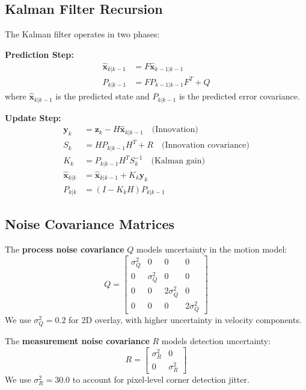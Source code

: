 \documentclass[9pt,a4paper,twocolumn,twoside]{tau-class/tau}
\begin{document}
    \subsection{Kalman Filter Recursion}

    The Kalman filter operates in two phases:

    \textbf{Prediction Step:}
    \begin{align}
        \hat{\mathbf{x}}_{k|k-1} &= F \hat{\mathbf{x}}_{k-1|k-1} \\
        P_{k|k-1} &= F P_{k-1|k-1} F^T + Q
    \end{align}
    where $\hat{\mathbf{x}}_{k|k-1}$ is the predicted state and $P_{k|k-1}$ is the predicted error covariance.

    \textbf{Update Step:}
    \begin{align}
        \mathbf{y}_k &= \mathbf{z}_k - H \hat{\mathbf{x}}_{k|k-1} \quad \text{(Innovation)} \\
        S_k &= H P_{k|k-1} H^T + R \quad \text{(Innovation covariance)} \\
        K_k &= P_{k|k-1} H^T S_k^{-1} \quad \text{(Kalman gain)} \\
        \hat{\mathbf{x}}_{k|k} &= \hat{\mathbf{x}}_{k|k-1} + K_k \mathbf{y}_k \\
        P_{k|k} &= (I - K_k H) P_{k|k-1}
    \end{align}

    \subsection{Noise Covariance Matrices}

    The \textbf{process noise covariance} $Q$ models uncertainty in the motion model:
    \begin{equation}
        Q = \begin{bmatrix}
            \sigma_Q^2 & 0 & 0 & 0 \\
            0 & \sigma_Q^2 & 0 & 0 \\
            0 & 0 & 2\sigma_Q^2 & 0 \\
            0 & 0 & 0 & 2\sigma_Q^2
        \end{bmatrix}
    \end{equation}
    We use $\sigma_Q^2 = 0.2$ for 2D overlay, with higher uncertainty in velocity components.

    The \textbf{measurement noise covariance} $R$ models detection uncertainty:
    \begin{equation}
        R = \begin{bmatrix}
            \sigma_R^2 & 0 \\
            0 & \sigma_R^2
        \end{bmatrix}
    \end{equation}
    We use $\sigma_R^2 = 30.0$ to account for pixel-level corner detection jitter.
\end{document}
